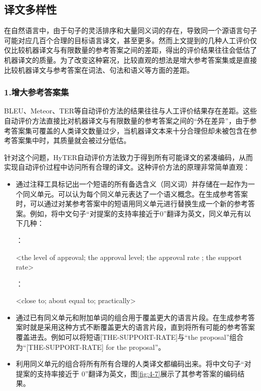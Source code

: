 \subsection{译文多样性}

\parinterval 在自然语言中，由于句子的灵活排序和大量同义词的存在，导致同一个源语言句子可能对应几百个合理的目标语言译文，甚至更多。然而上文提到的几种人工评价仅仅比较机器译文与有限数量的参考答案之间的差距，得出的评价结果往往会低估了机器译文的质量。为了改变这种窘况，比较直观的想法是增大参考答案集或是直接比较机器译文与参考答案在词法、句法和语义等方面的差距。


\subsubsection{1.增大参考答案集}

\parinterval BLEU、Meteor、TER等自动评价方法的结果往往与人工评价结果存在差距。这些自动评价方法直接比对机器译文与有限数量的参考答案之间的“外在差异”，由于参考答案集可覆盖的人类译文数量过少，当机器译文本来十分合理但却未被包含在参考答案集中时，其质量就会被过分低估。

\parinterval 针对这个问题，HyTER自动评价方法致力于得到所有可能译文的紧凑编码，从而实现自动评价过程中访问所有合理的译文。这种评价方法的原理非常简单直观：

\begin{itemize}
\vspace{0.5em}
\item 通过注释工具标记出一个短语的所有备选含义（同义词）并存储在一起作为一个同义单元。可以认为每个同义单元表达了一个语义概念。在生成参考答案时，可以通过对某参考答案中的短语用同义单元进行替换生成一个新的参考答案。例如，将中文句子“对提案的支持率接近于0”翻译为英文，同义单元有以下几种：

：

\parinterval <the level of approval; the approval level; the approval rate ; the support rate>

\noindent [CLOSE-TO]：

\parinterval <close to; about equal to; practically>
\vspace{0.5em}
\item 通过已有同义单元和附加单词的组合用于覆盖更大的语言片段。在生成参考答案时就是采用这种方式不断覆盖更大的语言片段，直到将所有可能的参考答案覆盖进去。例如可以将短语[THE-SUPPORT-RATE]与“the proposal”组合为“[THE-SUPPORT-RATE] for the proposal”。
\vspace{0.5em}
\item 利用同义单元的组合将所有所有合理的人类译文都编码出来。将中文句子“对提案的支持率接近于 0”翻译为英文，图\ref{fig:4-7}展示了其参考答案的编码结果。
\vspace{0.5em}
\end{itemize}

